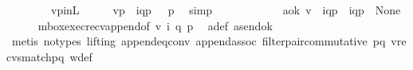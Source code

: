 \begin{isabellebody}
\ \ \ \ \ \ \ \ v{\isacharprime}{\kern0pt}p{\isacharunderscore}{\kern0pt}in{\isacharunderscore}{\kern0pt}L{\isacharparenright}{\kern0pt}\isanewline
\ \ \isamarkupfalse%
\ \isamarkupfalse%
\ {\isachardoublequoteopen}{\isacharparenleft}{\kern0pt}{\isacharparenleft}{\kern0pt}{\isacharparenleft}{\kern0pt}{\isacharquery}{\kern0pt}v{\isacharprime}{\kern0pt}{\isacharparenright}{\kern0pt}{\isasymdown}\isactrlsub p\ {\isasymsqdot}\ {\isacharbrackleft}{\kern0pt}{\isacharparenleft}{\kern0pt}{\isacharquery}{\kern0pt}{\isasymlangle}{\isacharparenleft}{\kern0pt}i\isactrlbsup q{\isasymrightarrow}p\isactrlesup {\isacharparenright}{\kern0pt}{\isasymrangle}{\isacharparenright}{\kern0pt}{\isacharbrackright}{\kern0pt}{\isacharparenright}{\kern0pt}{\isacharparenright}{\kern0pt}\ {\isasymin}\ {\isasymL}\isactrlsup {\isacharasterisk}{\kern0pt}\ p{\isachardoublequoteclose}\ \isamarkupfalse%
\ simp\isanewline
\ \ \ \ \ \ \isanewline
\ \ \isamarkupfalse%
\ \isamarkupfalse%
\ a{\isacharunderscore}{\kern0pt}ok{}{\isacharcolon}{\kern0pt}\ {\isachardoublequoteopen}{\isacharparenleft}{\kern0pt}{\isacharquery}{\kern0pt}v{\isacharprime}{\kern0pt}\ {\isasymsqdot}\ {\isacharparenleft}{\kern0pt}{\isacharbrackleft}{\kern0pt}{\isacharbang}{\kern0pt}{\isasymlangle}{\isacharparenleft}{\kern0pt}i\isactrlbsup q{\isasymrightarrow}p\isactrlesup {\isacharparenright}{\kern0pt}{\isasymrangle}{\isacharbrackright}{\kern0pt}\ {\isasymsqdot}\ {\isacharbrackleft}{\kern0pt}{\isacharquery}{\kern0pt}{\isasymlangle}{\isacharparenleft}{\kern0pt}i\isactrlbsup q{\isasymrightarrow}p\isactrlesup {\isacharparenright}{\kern0pt}{\isasymrangle}{\isacharbrackright}{\kern0pt}{\isacharparenright}{\kern0pt}{\isacharparenright}{\kern0pt}\ {\isasymin}\ {\isasymT}\isactrlbsub None\isactrlesub {\isachardoublequoteclose}\ \isanewline
\ \ \ \ \isamarkupfalse%
\ mbox{\isacharunderscore}{\kern0pt}exec{\isacharunderscore}{\kern0pt}recv{\isacharunderscore}{\kern0pt}append{\isacharbrackleft}{\kern0pt}of\ {\isachardoublequoteopen}{\isacharquery}{\kern0pt}v{\isacharprime}{\kern0pt}{\isachardoublequoteclose}\ i\ q\ p{\isacharbrackright}{\kern0pt}\ \isamarkupfalse%
\ a{\isacharunderscore}{\kern0pt}def\ a{\isacharunderscore}{\kern0pt}send{\isacharunderscore}{\kern0pt}ok\ \isamarkupfalse%
\ {\isacharparenleft}{\kern0pt}metis\ {\isacharparenleft}{\kern0pt}no{\isacharunderscore}{\kern0pt}types{\isacharcomma}{\kern0pt}\ lifting{\isacharparenright}{\kern0pt}\ append{}{\isacharunderscore}{\kern0pt}eq{\isacharunderscore}{\kern0pt}conv\ append{\isacharunderscore}{\kern0pt}assoc\ filter{\isacharunderscore}{\kern0pt}pair{\isacharunderscore}{\kern0pt}commutative\ pq\ v{\isacharprime}{\kern0pt}{\isacharunderscore}{\kern0pt}recvs{\isacharunderscore}{\kern0pt}match{\isacharunderscore}{\kern0pt}pq\ w{\isacharunderscore}{\kern0pt}def\isanewline

\end{isabellebody}
